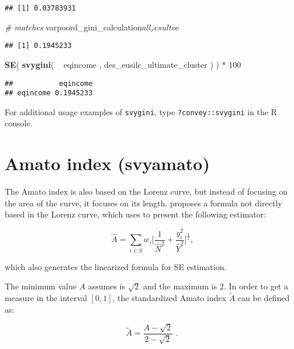 \documentclass[]{book}
\newenvironment{Shaded}{\begin{snugshade}}{\end{snugshade}}
\newcommand{\KeywordTok}[1]{\textcolor[rgb]{0.13,0.29,0.53}{\textbf{{#1}}}}
\newcommand{\DecValTok}[1]{\textcolor[rgb]{0.00,0.00,0.81}{{#1}}}
\newcommand{\StringTok}[1]{\textcolor[rgb]{0.31,0.60,0.02}{{#1}}}
\newcommand{\CommentTok}[1]{\textcolor[rgb]{0.56,0.35,0.01}{\textit{{#1}}}}
\newcommand{\NormalTok}[1]{{#1}}
\begin{document}
\begin{verbatim}
## [1] 0.03783931
\end{verbatim}

\begin{Shaded}
\begin{Highlighting}[]
\CommentTok{# matches}
\NormalTok{varpoord_gini_calculation$all_result$se}
\end{Highlighting}
\end{Shaded}

\begin{verbatim}
## [1] 0.1945233
\end{verbatim}

\begin{Shaded}
\begin{Highlighting}[]
\KeywordTok{SE}\NormalTok{( }\KeywordTok{svygini}\NormalTok{( ~}\StringTok{ }\NormalTok{eqincome , des_eusilc_ultimate_cluster ) ) *}\StringTok{ }\DecValTok{100}
\end{Highlighting}
\end{Shaded}

\begin{verbatim}
##           eqincome
## eqincome 0.1945233
\end{verbatim}

For additional usage examples of \texttt{svygini}, type
\texttt{?convey::svygini} in the R console.

\section{Amato index (svyamato)}\label{amato-index-svyamato}

The Amato index is also based on the Lorenz curve, but instead of
focusing on the area of the curve, it focuses on its length.
\citet{arnold2012} proposes a formula not directly based in the Lorenz
curve, which \citet{barabesi2016} uses to present the following
estimator:

\[
\widehat{A} = \sum_{i \in S} w_i \bigg[ \frac{1}{\widehat{N}^2} + \frac{y_i^2}{\widehat{Y}^2} \bigg]^{\frac{1}{2}} \text{,}
\]

which also generates the linearized formula for SE estimation.

The minimum value \(A\) assumes is \(\sqrt{2}\) and the maximum is
\(2\). In order to get a measure in the interval \([0,1]\), the
standardized Amato index \(\widetilde{A}\) can be defined as:

\[
\widetilde{A} = \frac{ A - \sqrt{2} }{2 - \sqrt{2} } \text{ .}
\]
\end{document}
